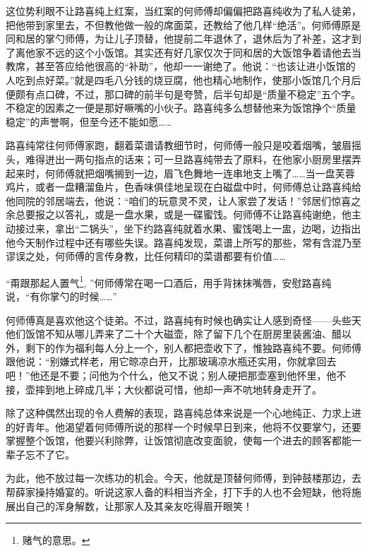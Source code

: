 \par 这位势利眼不让路喜纯上红案，当红案的何师傅却偏偏把路喜纯收为了私人徒弟，把他带到家里去，不但教他做一般的席面菜，还教给了他几样“绝活”。何师傅原是同和居的掌勺师傅，为让儿子顶替，他提前二年退休了，退休后为了补差，这才到了离他家不远的这个小饭馆。其实还有好几家仅次于同和居的大饭馆争着请他去当教席，甚至答应给他很高的“补助”，他却一一谢绝了。他说：“也该让进小饭馆的人吃到点好菜。”就是四毛八分钱的烧豆腐，他也精心地制作，使那小饭馆几个月后便颇有点口碑，不过，那口碑的前半句是夸赞，后半句却是“质量不稳定”五个字。不稳定的因素之一便是那好噘嘴的小伙子。路喜纯多么想替他来为饭馆挣个“质量稳定”的声誉啊，但至今还不能如愿……
\par 路喜纯常往何师傅家跑，翻着菜谱请教细节时，何师傅一般只是咬着烟嘴，皱眉摇头，难得迸出一两句指点的话来；可一旦路喜纯带去了原料，在他家小厨房里摆弄起来时，何师傅就把烟嘴搁到一边，眉飞色舞地一连串地支上嘴了……当一盘芙蓉鸡片，或者一盘糟溜鱼片，色香味俱佳地呈现在白磁盘中时，何师傅总让路喜纯给他同院的邻居端去，他说：“咱们的玩意灵不灵，让人家尝了发话！”邻居们惊喜之余总要报之以答礼，或是一盘水果，或是一碟蜜饯。何师傅不让路喜纯谢绝，他主动接过来，拿出“二锅头”，坐下约路喜纯就着水果、蜜饯喝上一盅，边喝，边指出他今天制作过程中还有哪些失误。路喜纯发现，菜谱上所写的那些，常有含混乃至谬误之处，何师傅的言传身教，比任何精印的菜谱都要有价值……
\par “甭跟那起人置气\footnote{赌气的意思。}, ”何师傅常在喝一口酒后，用手背抹抹嘴唇，安慰路喜纯说，“有你掌勺的时候……”
\par 何师傅真是喜欢他这个徒弟。不过，路喜纯有时候也确实让人感到奇怪——头些天他们饭馆不知从哪儿弄来了二十个大磁壶，除了留下几个在厨房里装酱油、醋以外，剩下的作为福利每人分上一个，别人都把壶收下了，惟独路喜纯不要。何师傅跟他说：“别嫌式样老，用它晾凉白开，比那玻璃凉水瓶还实用，你就拿回去吧！”他还是不要；问他为个什么，他又不说；别人硬把那壶塞到他怀里，他不接，壶摔到地上碎成几半；大伙都说可惜，他却一声不吭地转身走开了。
\par 除了这种偶然出现的令人费解的表现，路喜纯总体来说是一个心地纯正、力求上进的好青年。他渴望着何师傅所说的那样一个时候早日到来，他将不仅要掌勺，还要掌握整个饭馆，他要兴利除弊，让饭馆彻底改变面貌，使每一个进去的顾客都能一辈子忘不了它。
\par 为此，他不放过每一次练功的机会。今天，他就是顶替何师傅，到钟鼓楼那边，去帮薛家操持婚宴的。听说这家人备的料相当齐全，打下手的人也不会短缺，他将施展出自己的浑身解数，让那家人及其亲友吃得眉开眼笑！


